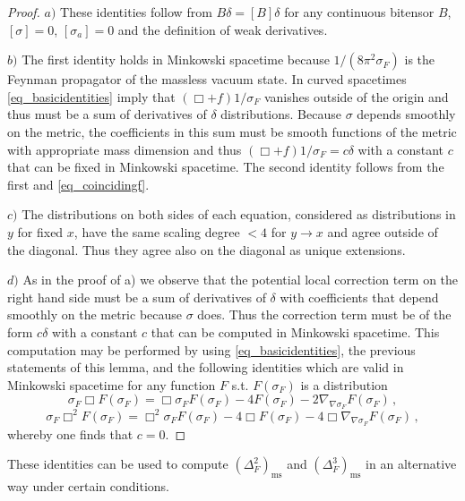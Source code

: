 \documentclass[a4paper,10pt,twoside]{article}
\numberwithin{equation}{section}
\newcounter{and}
\def\ms{\mathrm{ms}}
\theoremstyle{plain}
\theoremstyle{definition}
\begin{document}
\begin{proof}
$a)$ These identities follow from $B\delta=[B]\delta$ for any continuous bitensor $B$, $[\sigma]=0$, $[\sigma_a]=0$ and the definition of weak derivatives.

$b)$ The first identity holds in Minkowski spacetime because $1/(8\pi^2\sigma_F)$ is the Feynman propagator of the massless vacuum state. In curved spacetimes \eqref{eq_basicidentities} imply that $(\Box+f)1/\sigma_F$ vanishes outside of the origin and thus must be a sum of derivatives of $\delta$ distributions. Because $\sigma$ depends smoothly on the metric, the coefficients in this sum must be smooth functions of the metric with appropriate mass dimension and thus $(\Box+f)1/\sigma_F=c\delta$ with a constant $c$ that can be fixed in Minkowski spacetime. The second identity follows from the first and \eqref{eq_coincidingf}.

$c)$ The distributions on both sides of each equation, considered as distributions in $y$ for fixed $x$, have the same scaling degree $<4$ for $y\to x$ and agree outside of the diagonal. Thus they agree also on the diagonal as unique extensions.

$d)$ As in the proof of a) we observe that the potential local correction term on the right hand side must be a sum of derivatives of $\delta$ with coefficients that depend smoothly on the metric because $\sigma$ does. Thus the correction term must be of the form $c\delta$ with a constant $c$ that can be computed in Minkowski spacetime. This computation may be performed by using \eqref{eq_basicidentities}, the previous statements of this lemma, and the following identities which are valid in Minkowski spacetime for any function $F$ s.t. $F(\sigma_F)$ is a distribution
$$\sigma_F\Box  F(\sigma_F)=\Box \sigma_F F(\sigma_F) - 4 F(\sigma_F) - 2\nabla_{\nabla\sigma_F}F(\sigma_F)\,,$$
$$\sigma_F\Box^2  F(\sigma_F)=\Box^2 \sigma_F F(\sigma_F) - 4 \Box F(\sigma_F) - 4\Box \nabla_{\nabla\sigma_F}F(\sigma_F)\,,$$
whereby one finds that $c=0$.
\end{proof}

These identities can be used to compute $\left(\Delta^2_F\right)_\ms$ and $\left(\Delta^3_F\right)_\ms$ in an alternative way under certain conditions.
\end{document}

